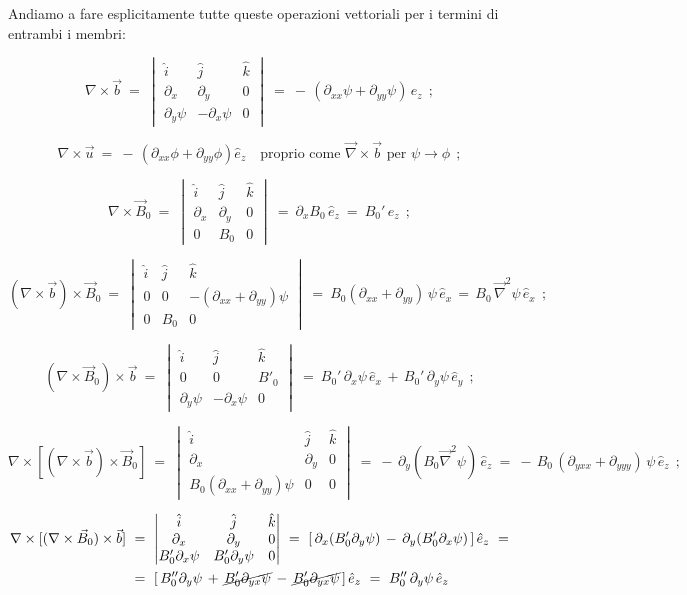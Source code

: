 Andiamo a fare esplicitamente tutte queste operazioni vettoriali per i termini di entrambi i membri:

\[\nabla\times \vec b\ =\ 
\begin{vmatrix}
	\hat i&\hat j&\hat k\\
	\partial_x &\partial_y& 0\\
	\partial_y\psi&-\partial _x\psi&0
\end{vmatrix}
\ =\ -\,(\partial_{xx}\psi+\partial_{yy}\psi)\,\hat e_z\ \ ;\] 

\[\nabla\times\vec u\ =\ -\,(\partial_{xx}\phi+\partial_{yy}\phi)\hat e_z\quad \text{proprio come $\vec\nabla \times\vec b$ per $\psi\to\phi$}\ \ ;\]

\[\nabla\times \vec B_0\ =\
\begin{vmatrix}
	\hat i&\hat j&\hat k\\
	\partial_x &\partial_y& 0\\
	0&B_0&0
\end{vmatrix}
\ =\ \partial _x B_0 \, \hat e_z\ =\ B_0' \,\hat e_z\ \ ;\] 

\[(\nabla\times\vec b)\times\vec B_0\ =\
\begin{vmatrix}
	\hat i&\hat j&\hat k\\
	0 & 0& -(\partial_{xx}+\partial_{yy})\psi\\
	0 & B_0& 0
\end{vmatrix}
\ =\ B_0(\partial_{xx}+\partial_{yy})\,\psi\,\hat e_x\, =\, B_0\, \vec \nabla^2 \psi \, \hat e_x\ \ ;\]

\[(\nabla\times\vec B_0)\times\vec b\ =\
\begin{vmatrix}
	\hat i&\hat j&\hat k\\
	0&0&B'_0\\
	\partial_y\psi&-\partial_x\psi&0
\end{vmatrix}
\ =\ B_0'\,\partial_x\psi\,\hat e_x\, + \,B_0'\,\partial_y\psi\,\hat e_y\ \ ;\] 

\[\nabla\times[(\nabla\times \vec b)\times\vec B_0]\ =\
\begin{vmatrix}
	\hat i& \hat j&\hat k \\
	\partial _x&\partial_y&0\\
	B_0(\partial_{xx}+\partial_{yy})\psi&0&0
\end{vmatrix}
\ =\ -\, \partial_y( B_0\vec \nabla^2 \psi )\, \hat e_z\ =\ -\,B_0\,(\partial_{yxx}+\partial_{yyy})\,\psi\,\hat e_z\ \ ;\] 

\[\begin{aligned}
\nabla\times[(\nabla\times \vec B_0)\times\vec b]\
&=\
\begin{vmatrix}
	\hat i& \hat j&\hat k \\
	\partial _x&\partial_y&0\\
	B_0'\partial_x\psi&B_0'\partial_y\psi&0
\end{vmatrix}
\ =\ [\,\partial_x(B_0'\partial_y\psi)\, - \, \partial_y (B_0'\partial_{x}\psi)\,]\, \hat e_z\ =\\
&=\ [\, B_0''\partial_y\psi\,+\,\cancel{B_0'\partial_{yx}\psi}\,-\,\cancel{B_0'\partial_{yx}\psi}\,]\,\hat e_z\ =\ B_0''\,\partial_y\psi\,\hat e_z
\end{aligned}\]

